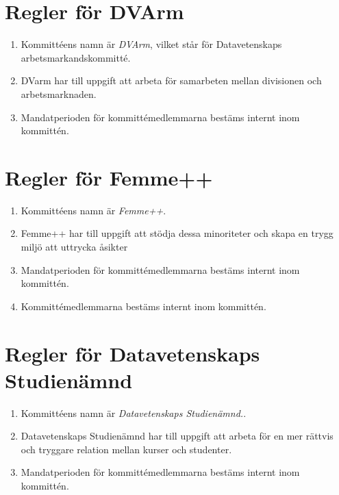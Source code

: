 \documentclass{dvd}
\begin{document}
\section{Regler för DVArm}

\begin{enumerate}[label=\arabic* §, ref=\arabic*]
	\item Kommittéens namn är \emph{DVArm}, vilket står för Datavetenskaps arbetsmarkandskommitté.

	\item DVarm har till uppgift att arbeta för samarbeten mellan divisionen och arbetsmarknaden.

	\item Mandatperioden för kommittémedlemmarna bestäms internt inom kommittén.

\end{enumerate}

\section{Regler för Femme++}

\begin{enumerate}[label=\arabic* §, ref=\arabic*]
	\item Kommittéens namn är \emph{Femme++}.

	\item Femme++ har till uppgift att stödja dessa minoriteter och skapa en trygg miljö att uttrycka åsikter

	\item Mandatperioden för kommittémedlemmarna bestäms internt inom kommittén.

	\item Kommittémedlemmarna bestäms internt inom kommittén.
\end{enumerate}

\section{Regler för Datavetenskaps Studienämnd}

\begin{enumerate}[label=\arabic* §, ref=\arabic*]
	\item Kommittéens namn är \emph{Datavetenskaps Studienämnd.}.

	\item Datavetenskaps Studienämnd har till uppgift att arbeta för en mer rättvis och tryggare relation mellan kurser och studenter.

	\item Mandatperioden för kommittémedlemmarna bestäms internt inom kommittén.
\end{enumerate}
\end{document}
